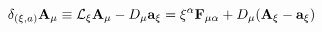 \begin{equation}
\delta _{(\xi ,a)}{\bf A}_{\mu }\equiv {\cal L}_{\xi }{\bf A}_{\mu
} -D_{\mu }{\bf a}_{\xi }=\xi ^{\alpha }{\bf F}_{\mu \alpha }+
D_{\mu }({\bf A}_{\xi }-{\bf a}_{\xi })
\end{equation}

